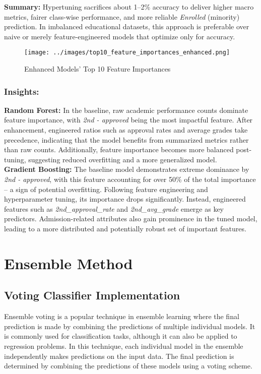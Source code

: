 \documentclass[twoside,final]{hcmut-report}
\begin{document}
\textbf{Summary:} Hypertuning sacrifices about 1--2\% accuracy to deliver higher macro metrics, fairer class-wise performance, and more reliable \textit{Enrolled} (minority) prediction. In imbalanced educational datasets, this approach is preferable over naive or merely feature-engineered models that optimize only for accuracy.

\begin{figure}[H]
  \centering
  \texttt{[image: ../images/top10\_feature\_importances\_enhanced.png]}
  \caption{Enhanced Models' Top 10 Feature Importances}
  \label{top10_enhanced}
\end{figure}
\subsubsection*{Insights:}

\textbf{Random Forest:} In the baseline, raw academic performance counts dominate feature importance, with \emph{2nd - approved} being the most impactful feature. After enhancement, engineered ratios such as approval rates and average grades take precedence, indicating that the model benefits from summarized metrics rather than raw counts. Additionally, feature importance becomes more balanced post-tuning, suggesting reduced overfitting and a more generalized model.\\

\textbf{Gradient Boosting:} The baseline model demonstrates extreme dominance by \emph{2nd - approved}, with this feature accounting for over 50\% of the total importance -- a sign of potential overfitting. Following feature engineering and hyperparameter tuning, its importance drops significantly. Instead, engineered features such as \emph{2nd\_approval\_rate} and \emph{2nd\_avg\_grade} emerge as key predictors. Admission-related attributes also gain prominence in the tuned model, leading to a more distributed and potentially robust set of important features.

\section{Ensemble Method}
\subsection{Voting Classifier Implementation}
Ensemble voting is a popular technique in ensemble learning where the final prediction is made by combining the predictions of multiple individual models. It is commonly used for classification tasks, although it can also be applied to regression problems. In this technique, each individual model in the ensemble independently makes predictions on the input data. The final prediction is determined by combining the predictions of these models using a voting scheme.
\end{document}
